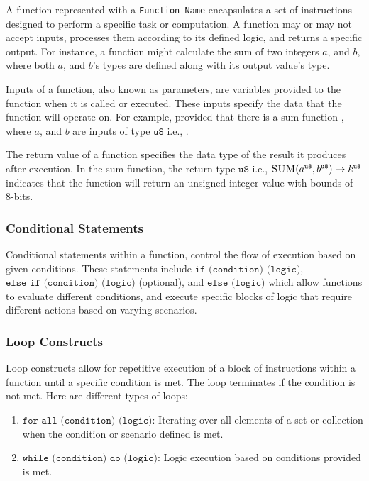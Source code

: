 \documentclass[../alan-handbook.tex]{subfiles}
\begin{document}
A function represented with a \texttt{Function Name}{} encapsulates a set of instructions designed to perform a specific task or computation. A function may or may not accept inputs, processes them according to its defined logic, and returns a specific output. For instance, a function might calculate the sum of two integers $a$, and $b$, where both $a$, and $b$'s types are defined along with its output value's type.

Inputs of a function, also known as parameters, are variables provided to the function when it is called or executed. These inputs specify the data that the function will operate on. For example, provided that there is a sum function , where $a$, and $b$ are inputs of type $\texttt{u8}$ i.e., .

The return value of a function specifies the data type of the result it produces after execution. In the sum function, the return type $\texttt{u8}$ i.e., $\Call{SUM}{a^{\texttt{u8}},b^{\texttt{u8}}} \to k^{\texttt{u8}}$  indicates that the function will return an unsigned integer value with bounds of 8-bits.

\subsubsection{Conditional Statements} \label{ConditionalStatements}

Conditional statements within a function, control the flow of execution based on given conditions. These statements include $\texttt{if (condition) (logic)}$, $\texttt{else if (condition) (logic)}$ (optional), and $\texttt{else (logic)}$ which allow functions to evaluate different conditions, and execute specific blocks of logic that require different actions based on varying scenarios.

\subsubsection{Loop Constructs} \label{LoopConstructs}

Loop constructs allow for repetitive execution of a block of instructions within a function until a specific condition is met. The loop terminates if the condition is not met. Here are different types of loops:

\begin{enumerate}
    \item $\texttt{for all (condition) (logic)}$: Iterating over all elements of a set or collection when the condition or scenario defined is met.
    \item $\texttt{while (condition) do (logic)}$: Logic execution based on conditions provided is met. 
\end{enumerate}
\end{document}
